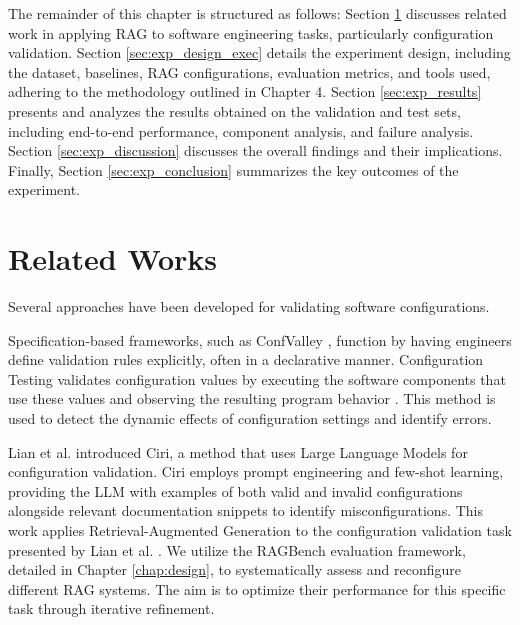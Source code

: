 The remainder of this chapter is structured as follows: Section \ref{sec:related_works_exp} discusses related work in applying RAG to software engineering tasks, particularly configuration validation. Section \ref{sec:exp_design_exec} details the experiment design, including the dataset, baselines, RAG configurations, evaluation metrics, and tools used, adhering to the methodology outlined in Chapter 4. Section \ref{sec:exp_results} presents and analyzes the results obtained on the validation and test sets, including end-to-end performance, component analysis, and failure analysis. Section \ref{sec:exp_discussion} discusses the overall findings and their implications. Finally, Section \ref{sec:exp_conclusion} summarizes the key outcomes of the experiment.

\section{Related Works} \label{sec:related_works_exp}
Several approaches have been developed for validating software configurations.

Specification-based frameworks, such as ConfValley \cite{Huang.2015}, function by having engineers define validation rules explicitly, often in a declarative manner. Configuration Testing validates configuration values by executing the software components that use these values and observing the resulting program behavior \cite{XudongSun.2020}. This method is used to detect the dynamic effects of configuration settings and identify errors.

Lian et al. \cite{Lian.2024} introduced Ciri, a method that uses Large Language Models for configuration validation. Ciri employs prompt engineering and few-shot learning, providing the LLM with examples of both valid and invalid configurations alongside relevant documentation snippets to identify misconfigurations. This work applies Retrieval-Augmented Generation to the configuration validation task presented by Lian et al. \cite{Lian.2024}. We utilize the RAGBench evaluation framework, detailed in Chapter \ref{chap:design}, to systematically assess and reconfigure different RAG systems. The aim is to optimize their performance for this specific task through iterative refinement.

